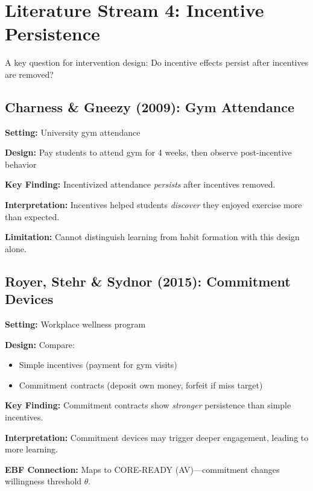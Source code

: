 \documentclass[11pt, a4paper]{article}
\begin{document}
\section{Literature Stream 4: Incentive Persistence}
\label{sec:lrn-incentive-persistence}

A key question for intervention design: Do incentive effects persist after incentives are removed?

\subsection{Charness \& Gneezy (2009): Gym Attendance}

\begin{tcolorbox}[colback=gray!5!white, colframe=gray!75!black,
    title=Charness \& Gneezy (2009): Exercise and Incentives]

\textbf{Setting:} University gym attendance

\textbf{Design:} Pay students to attend gym for 4 weeks, then observe post-incentive behavior

\textbf{Key Finding:} Incentivized attendance \textit{persists} after incentives removed.

\textbf{Interpretation:} Incentives helped students \textit{discover} they enjoyed exercise more than expected.

\textbf{Limitation:} Cannot distinguish learning from habit formation with this design alone.

\end{tcolorbox}

\subsection{Royer, Stehr \& Sydnor (2015): Commitment Devices}

\begin{tcolorbox}[colback=gray!5!white, colframe=gray!75!black,
    title=Royer, Stehr \& Sydnor (2015): Incentives and Commitment]

\textbf{Setting:} Workplace wellness program

\textbf{Design:} Compare:
\begin{itemize}[nosep]
    \item Simple incentives (payment for gym visits)
    \item Commitment contracts (deposit own money, forfeit if miss target)
\end{itemize}

\textbf{Key Finding:} Commitment contracts show \textit{stronger} persistence than simple incentives.

\textbf{Interpretation:} Commitment devices may trigger deeper engagement, leading to more learning.

\textbf{EBF Connection:} Maps to CORE-READY (AV)---commitment changes willingness threshold $\theta$.

\end{tcolorbox}
\end{document}
